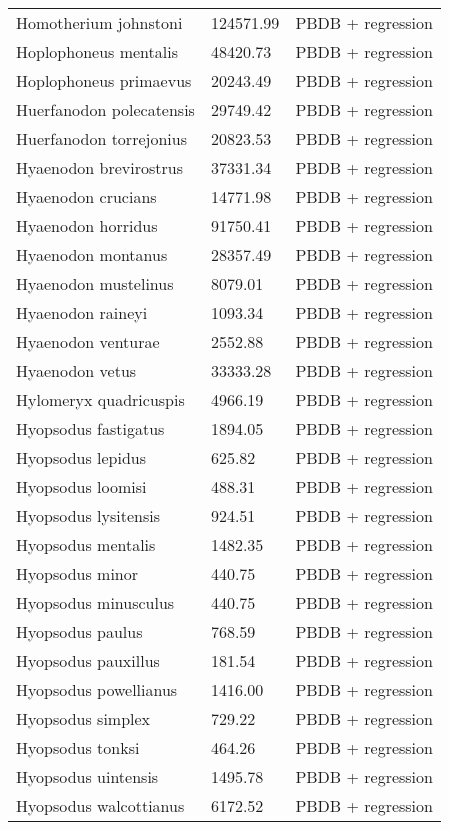 \documentclass{article}
\begin{document}
\begin{center}
\begin{longtable}{p{} p{} p{} }
  Homotherium johnstoni & 124571.99 & PBDB + regression \\ 
  Hoplophoneus mentalis & 48420.73 & PBDB + regression \\ 
  Hoplophoneus primaevus & 20243.49 & PBDB + regression \\ 
  Huerfanodon polecatensis & 29749.42 & PBDB + regression \\ 
  Huerfanodon torrejonius & 20823.53 & PBDB + regression \\ 
  Hyaenodon brevirostrus & 37331.34 & PBDB + regression \\ 
  Hyaenodon crucians & 14771.98 & PBDB + regression \\ 
  Hyaenodon horridus & 91750.41 & PBDB + regression \\ 
  Hyaenodon montanus & 28357.49 & PBDB + regression \\ 
  Hyaenodon mustelinus & 8079.01 & PBDB + regression \\ 
  Hyaenodon raineyi & 1093.34 & PBDB + regression \\ 
  Hyaenodon venturae & 2552.88 & PBDB + regression \\ 
  Hyaenodon vetus & 33333.28 & PBDB + regression \\ 
  Hylomeryx quadricuspis & 4966.19 & PBDB + regression \\ 
  Hyopsodus fastigatus & 1894.05 & PBDB + regression \\ 
  Hyopsodus lepidus & 625.82 & PBDB + regression \\ 
  Hyopsodus loomisi & 488.31 & PBDB + regression \\ 
  Hyopsodus lysitensis & 924.51 & PBDB + regression \\ 
  Hyopsodus mentalis & 1482.35 & PBDB + regression \\ 
  Hyopsodus minor & 440.75 & PBDB + regression \\ 
  Hyopsodus minusculus & 440.75 & PBDB + regression \\ 
  Hyopsodus paulus & 768.59 & PBDB + regression \\ 
  Hyopsodus pauxillus & 181.54 & PBDB + regression \\ 
  Hyopsodus powellianus & 1416.00 & PBDB + regression \\ 
  Hyopsodus simplex & 729.22 & PBDB + regression \\ 
  Hyopsodus tonksi & 464.26 & PBDB + regression \\ 
  Hyopsodus uintensis & 1495.78 & PBDB + regression \\ 
  Hyopsodus walcottianus & 6172.52 & PBDB + regression \\ 

\end{longtable}
\end{center}
\end{document}
